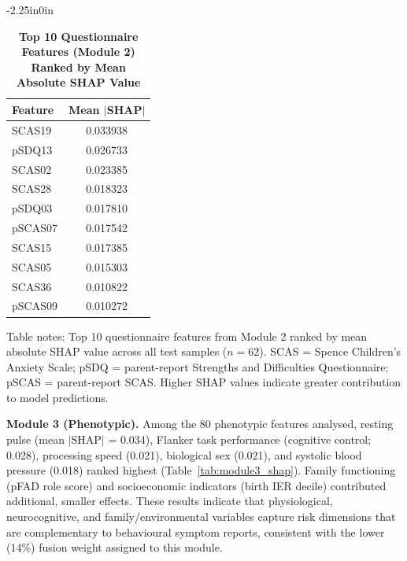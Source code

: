 \documentclass[10pt,letterpaper]{article}
\begin{document}
\begin{table}[!t]
\begin{adjustwidth}{-2.25in}{0in}
\centering
\caption{\textbf{Top 10 Questionnaire Features (Module 2) Ranked by Mean Absolute SHAP Value}}
\label{tab:module2_shap}
\footnotesize
\renewcommand{\arraystretch}{1.3}

\begin{tabular}{|l|c|}
\hline
\textbf{Feature} & \textbf{Mean $|$SHAP$|$} \\
\hline
SCAS19 & 0.033938 \\
\hline
pSDQ13 & 0.026733 \\
\hline
SCAS02 & 0.023385 \\
\hline
SCAS28 & 0.018323 \\
\hline
pSDQ03 & 0.017810 \\
\hline
pSCAS07 & 0.017542 \\
\hline
SCAS15 & 0.017385 \\
\hline
SCAS05 & 0.015303 \\
\hline
SCAS36 & 0.010822 \\
\hline
pSCAS09 & 0.010272 \\
\hline
\end{tabular}

\begin{flushleft}
Table notes: Top 10 questionnaire features from Module 2 ranked by mean absolute SHAP value across all test samples ($n=62$). SCAS = Spence Children's Anxiety Scale; pSDQ = parent-report Strengths and Difficulties Questionnaire; pSCAS = parent-report SCAS. Higher SHAP values indicate greater contribution to model predictions.
\end{flushleft}
\end{adjustwidth}
\end{table}

\textbf{Module 3 (Phenotypic).} Among the 80 phenotypic features analysed, resting pulse (mean $|\mathrm{SHAP}|$ = 0.034), Flanker task performance (cognitive control; 0.028), processing speed (0.021), biological sex (0.021), and systolic blood pressure (0.018) ranked highest (Table~\ref{tab:module3_shap}). Family functioning (pFAD role score) and socioeconomic indicators (birth IER decile) contributed additional, smaller effects. These results indicate that physiological, neurocognitive, and family/environmental variables capture risk dimensions that are complementary to behavioural symptom reports, consistent with the lower (14\%) fusion weight assigned to this module.
\end{document}
